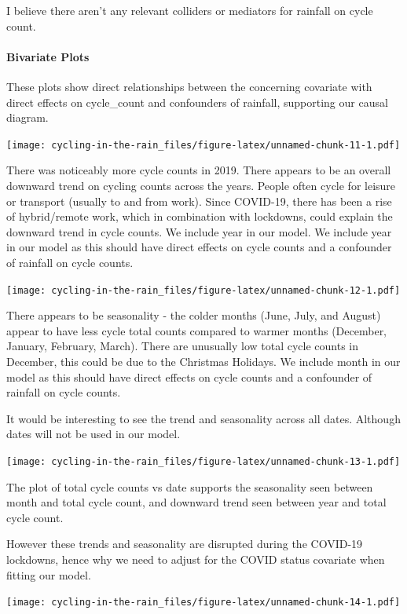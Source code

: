 \documentclass[
]{article}
\begin{document}
I believe there aren't any relevant colliders or mediators for rainfall
on cycle count.

\hypertarget{bivariate-plots}{%
\paragraph{Bivariate Plots}\label{bivariate-plots}}

These plots show direct relationships between the concerning covariate
with direct effects on cycle\_count and confounders of rainfall,
supporting our causal diagram.

\texttt{[image: cycling-in-the-rain\_files/figure-latex/unnamed-chunk-11-1.pdf]}

There was noticeably more cycle counts in 2019. There appears to be an
overall downward trend on cycling counts across the years. People often
cycle for leisure or transport (usually to and from work). Since
COVID-19, there has been a rise of hybrid/remote work, which in
combination with lockdowns, could explain the downward trend in cycle
counts. We include year in our model. We include year in our model as
this should have direct effects on cycle counts and a confounder of
rainfall on cycle counts.

\texttt{[image: cycling-in-the-rain\_files/figure-latex/unnamed-chunk-12-1.pdf]}

There appears to be seasonality - the colder months (June, July, and
August) appear to have less cycle total counts compared to warmer months
(December, January, February, March). There are unusually low total
cycle counts in December, this could be due to the Christmas Holidays.
We include month in our model as this should have direct effects on
cycle counts and a confounder of rainfall on cycle counts.

It would be interesting to see the trend and seasonality across all
dates. Although dates will not be used in our model.

\texttt{[image: cycling-in-the-rain\_files/figure-latex/unnamed-chunk-13-1.pdf]}

The plot of total cycle counts vs date supports the seasonality seen
between month and total cycle count, and downward trend seen between
year and total cycle count.

However these trends and seasonality are disrupted during the COVID-19
lockdowns, hence why we need to adjust for the COVID status covariate
when fitting our model.

\texttt{[image: cycling-in-the-rain\_files/figure-latex/unnamed-chunk-14-1.pdf]}
\end{document}

